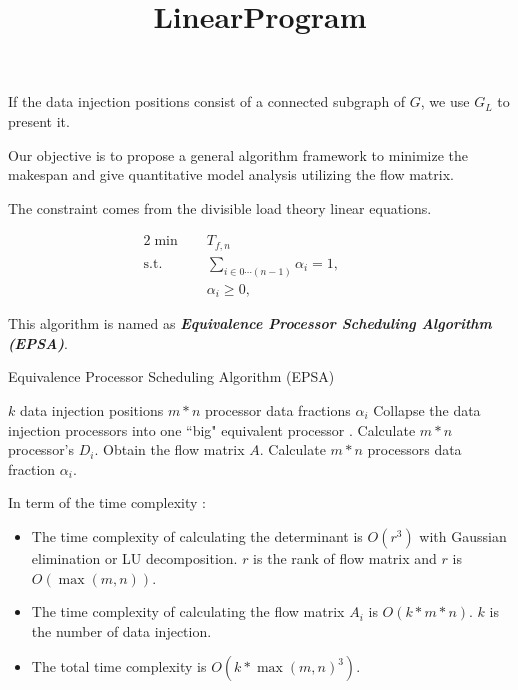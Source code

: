 If the data injection positions consist of a connected subgraph of $G$, we use $G_{L}$ to present it.

Our objective is to propose a general algorithm framework to minimize the makespan and give quantitative model analysis utilizing the flow matrix.  

The constraint comes from the divisible load theory linear equations.   

\title{LinearProgram}
\maketitle
\begin{alignat}{2}
\min\quad & T_{f,n}\\
\mbox{s.t.}\quad
&\sum_{i \in 0 \cdots (n-1)} \alpha_{i} = 1, &\quad& \\
&\alpha_{i} \geq 0, &{}& 
\end{alignat}

This algorithm is named as \textbf{\textit{Equivalence Processor Scheduling Algorithm (EPSA)}}.

\begin{algorithm}
\caption{Equivalence Processor Scheduling Algorithm (EPSA)}
\begin{algorithmic} 
\renewcommand{\algorithmicrequire}{\textbf{Input:}}
\renewcommand{\algorithmicensure}{\textbf{Output:}}
\REQUIRE $k$ data injection positions
\ENSURE $m*n$ processor data fractions $\alpha_{i}$
\STATE Collapse the data injection processors into one ``big" equivalent processor  \cite{robertazzi1993processor}.
\STATE Calculate $m*n$ processor's $D_{i}$.
\STATE Obtain the flow matrix $A$.
\STATE Calculate $m*n$ processors data fraction $\alpha_{i}$.
\end{algorithmic}
\end{algorithm}

In term of the time complexity : 

\begin{itemize}
\item The time complexity of calculating the determinant is $O(r^{3})$ with Gaussian elimination or LU decomposition.  $r$ is the rank of flow matrix and $r$ is $O(\max(m,n))$.
\item The time complexity of calculating the flow matrix $A_{i}$ is $O(k*m*n)$. $k$ is the number of data injection.
\item The total time complexity is $O(k*\max(m,n)^{3})$.
\end{itemize}
